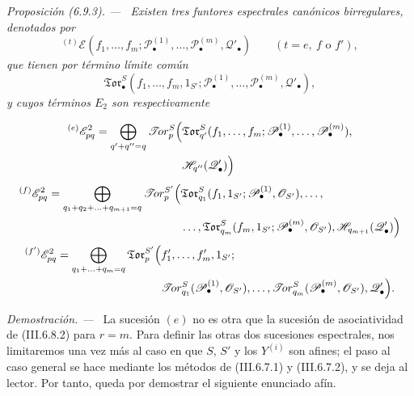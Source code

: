 \documentclass[10pt,oneside]{book}
\newcommand{\sref}[2][]{\textup{(#2)}}
\newcommand{\oldpage}[2][]{\setcounter{footnote}{0}\marginpar{\scriptsize\textbf{#1}~|~#2}\ignorespaces}
\newenvironment{proposition}[1][]{\par\medskip\noindent\itshape Proposición (#1). ---\ }{\par}
\newenvironment{proof}{\par\medskip\noindent\textit{Demostración. ---\ }}{\par}
\begin{document}
\begin{proposition}[6.9.3]
\label{III.6.9.3}
Existen tres funtores espectrales canónicos birregulares, denotados por
\[
{}^{(t)}\mathscr E(f_1,\ldots,f_m;
\mathscr P_\bullet^{(1)},\ldots,\mathscr P_\bullet^{(m)},
\mathscr Q'_\bullet)
\qquad (t=e,\ f\text{ o }f'),
\]
que tienen por término límite común
\[
\mathfrak{Tor}_\bullet^S(f_1,\ldots,f_m,1_{S'};
\mathscr P_\bullet^{(1)},\ldots,\mathscr P_\bullet^{(m)},
\mathscr Q'_\bullet),
\]
y cuyos términos $E_2$ son respectivamente

\oldpage[III]{167}
\[
\begin{split}
  {}^{(e)}\mathscr E_{pq}^2
  =\bigoplus_{q'+q''=q}
  \mathscr{T}\!or_p^S\Bigl(
  &\mathfrak{Tor}_{q'}^S
  (f_1,\ldots,f_m;
   \mathscr P_\bullet^{(1)},\ldots,\mathscr P_\bullet^{(m)}),\\
  &\mathscr H_{q''}(\mathscr Q'_\bullet)
  \Bigr)
\end{split}
\]
\[
\begin{split}
  {}^{(f)}\mathscr E_{pq}^2
  =\bigoplus_{q_1+q_2+\ldots+q_{m+1}=q}
  \mathscr{T}\!or_p^{S'}\Bigl(
  &\mathfrak{Tor}_{q_1}^S
  (f_1,1_{S'};\mathscr P_\bullet^{(1)},\mathscr O_{S'}),\ldots,\\
  &\ldots,\mathfrak{Tor}_{q_m}^S
  (f_m,1_{S'};\mathscr P_\bullet^{(m)},\mathscr O_{S'}),
  \mathscr H_{q_{m+1}}(\mathscr Q'_\bullet)
  \Bigr)
\end{split}
\]
\[
\begin{split}
  {}^{(f')}\mathscr E_{pq}^2
  =\bigoplus_{q_1+\ldots+q_m=q}
  \mathfrak{Tor}_p^{S'}\Bigl(
  &f'_1,\ldots,f'_m,1_{S'};\\
  &\mathscr{T}\!or_{q_1}^S
  (\mathscr P_\bullet^{(1)},\mathscr O_{S'}),\ldots,
  \mathscr{T}\!or_{q_m}^S
  (\mathscr P_\bullet^{(m)},\mathscr O_{S'}),
  \mathscr Q'_\bullet
  \Bigr).
\end{split}
\]
\end{proposition}

\begin{proof}
La sucesión $(e)$ no es otra que la sucesión de asociatividad de
\sref{III.6.8.2} para $r=m$. Para definir las otras dos sucesiones
espectrales, nos limitaremos una vez más al caso en que $S$, $S'$ y los
$Y^{(i)}$ son afines; el paso al caso general se hace mediante los métodos de
\sref{III.6.7.1} y \sref{III.6.7.2}, y se deja al lector. Por tanto, queda
por demostrar el siguiente enunciado afín.
\end{proof}
\end{document}
